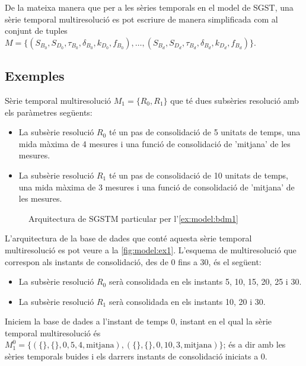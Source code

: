 De la mateixa manera que per a les sèries temporals en el model de
SGST, una sèrie temporal multiresolució es pot escriure de manera
simplificada com al conjunt de tuples $M = \{ (S_{B_0}, S_{D_0} ,
\tau_{B_0}, \delta_{B_0}, k_{D_0}, f_{B_0} ), \dotsc, (S_{B_d},
S_{D_d} , \tau_{B_d}, \delta_{B_d}, k_{D_d}, f_{B_d} ) \}$.




\subsection{Exemples}

\begin{example} 
\label{ex:model:bdm1}%


Sèrie temporal multiresolució $M_1=\{R_0,R_1\}$ que té dues subsèries
resolució amb els paràmetres següents:
\begin{itemize}
\item La subsèrie resolució $R_0$ té un pas de consolidació de 5
  unitats de temps, una mida màxima de 4 mesures i una funció de
  consolidació de 'mitjana' de les mesures.
\item La subsèrie resolució $R_1$ té un pas de consolidació de 10
  unitats de temps, una mida màxima de 3 mesures i una funció de
  consolidació de 'mitjana' de les mesures.
\end{itemize}

\begin{figure}[tp]
\centering

\caption{Arquitectura de SGSTM particular per l'\autoref{ex:model:bdm1}}
\label{fig:model:ex1}
\end{figure}

L'arquitectura de la base de dades que conté aquesta sèrie temporal
multiresolució es pot veure a la \autoref{fig:model:ex1}. 
 L'esquema
de multiresolució que correspon als instants de consolidació, des de 0
fins a 30, és el següent:
\begin{itemize}
\item La subsèrie resolució $R_0$ serà consolidada en els instants 5,
  10, 15, 20, 25 i 30.
\item La subsèrie resolució $R_1$ serà consolidada en els instants 10,
  20 i 30.
\end{itemize}


Iniciem la base de dades a l'instant de temps 0, instant en el qual la
sèrie temporal multiresolució és $M_1^0 = \{ ( \{\} , \{\} , 0 , 5 ,4
, \text{mitjana} ) , ( \{\} , \{\} , 0 , 10 ,3 , \text{mitjana} ) \}$;
és a dir amb les sèries temporals buides i els darrers instants de
consolidació iniciats a 0.





\end{example}
